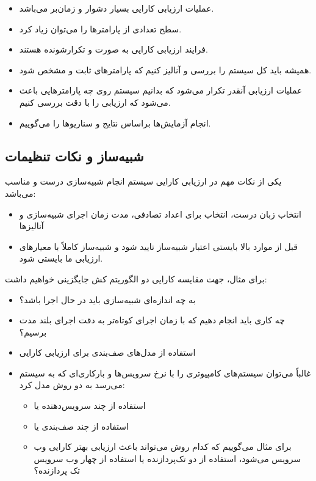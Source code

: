 \begin{itemize}
    \item عملیات ارزیابی کارایی بسیار دشوار و زمان‌بر می‌باشد.
    \item سطح تعدادی از پارامتر‌ها را می‌توان زیاد کرد.
    \item فرایند ارزیابی کارایی به صورت  و تکرارشونده هستند.
    \item همیشه باید کل سیستم را بررسی و آنالیز کنیم که پارامتر‌های ثابت و
     مشخص شود.
    \item عملیات ارزیابی آنقدر تکرار می‌شود که بدانیم سیستم روی چه پارامتر‌هایی
    باعث می‌شود که ارزیابی را با دقت بررسی کنیم.
    \item انجام آزمایش‌ها براساس نتایج و سناریو‌ها را  می‌گوییم.
\end{itemize}

\subsection{شبیه‌ساز و نکات تنظیمات}

یکی از نکات مهم در ارزیابی کارایی سیستم انجام شبیه‌سازی درست و مناسب می‌باشد:

\begin{itemize}
    \item انتخاب زبان درست، انتخاب  برای اعداد تصادفی، مدت زمان اجرای
    شبیه‌سازی و آنالیز‌ها
    \item قبل از موارد بالا بایستی اعتبار شبیه‌ساز تایید شود و شبیه‌ساز کاملاً
    با معیار‌های ارزیابی ما بایستی  شود.
\end{itemize}

برای مثال، جهت مقایسه کارایی دو الگوریتم کش جایگزینی خواهیم داشت:

\begin{itemize}
    \item به چه اندازه‌ای شبیه‌سازی باید در حال اجرا باشد؟
    \item چه کاری باید انجام دهیم که با زمان اجرای کوتاه‌تر به دقت اجرای بلند
    مدت برسیم؟
    \item استفاده از مدل‌های صف‌بندی برای ارزیابی کارایی
    \item غالباً می‌توان سیستم‌های کامپیوتری را با نرخ سرویس‌ها و بارکاری‌ای که
    به سیستم می‌رسد به دو روش مدل کرد:
    \begin{itemize}
        \item استفاده از چند سرویس‌دهنده یا 
        \item استفاده از چند صف‌بندی یا 
        \item برای مثال می‌گوییم که کدام روش می‌تواند باعث ارزیابی بهتر کارایی
        وب سرویس می‌شود، استفاده از دو تک‌پردازنده یا استفاده از چهار وب سرویس
        تک پردازنده؟
    \end{itemize}
\end{itemize}

